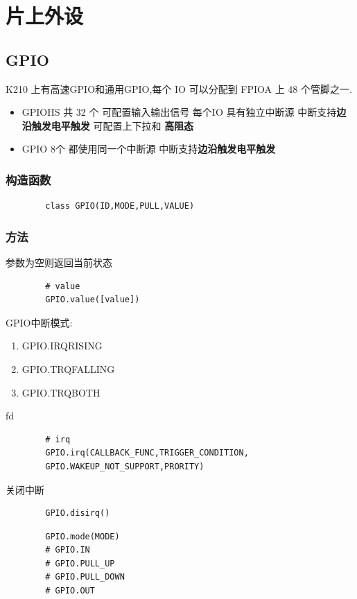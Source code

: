 \documentclass[UTF8]{ctexart}
\begin{document}
    \section{片上外设}
    \subsection{GPIO}
    K210 上有高速GPIO和通用GPIO,每个 IO 可以分配到 FPIOA 上 48 个管脚之一.
    \begin{itemize}
        \item GPIOHS 共 32 个
        \subitem 可配置输入输出信号
        \subitem 每个IO 具有独立中断源
        \subitem 中断支持\textbf{边沿触发}\textbf{电平触发}
        \subitem 可配置上下拉和 \textbf{高阻态}
        \item GPIO 8个
        \subitem 都使用同一个中断源
        \subitem 中断支持\textbf{边沿触发}\textbf{电平触发}
    \end{itemize}

    \subsubsection{构造函数}
    \begin{lstlisting}
        class GPIO(ID,MODE,PULL,VALUE)
    \end{lstlisting}
    \subsubsection{方法}
    参数为空则返回当前状态
    \begin{lstlisting}
        # value
        GPIO.value([value])  
    \end{lstlisting}
    
    GPIO中断模式:
    \begin{enumerate}
        \item GPIO.IRQ\textunderscore RISING
        \item GPIO.TRQ\textunderscore FALLING
        \item GPIO.TRQ\textunderscore BOTH
    \end{enumerate}

   fd

    \begin{lstlisting}
        # irq
        GPIO.irq(CALLBACK_FUNC,TRIGGER_CONDITION,
        GPIO.WAKEUP_NOT_SUPPORT,PRORITY)
    \end{lstlisting}



        关闭中断
    \begin{lstlisting}
        GPIO.disirq()  
    \end{lstlisting}
    \begin{lstlisting}
        GPIO.mode(MODE)
        # GPIO.IN 
        # GPIO.PULL_UP 
        # GPIO.PULL_DOWN
        # GPIO.OUT
    \end{lstlisting}
    
\end{document}
